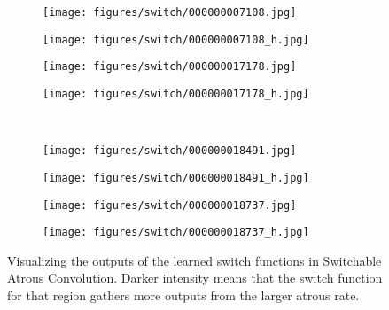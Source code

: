 \documentclass[final]{cvpr}
\begin{document}
\begin{figure*}
    \centering
    \begin{subfigure}[t]{0.24\linewidth}
        \centering
        \texttt{[image: figures/switch/000000007108.jpg]}
    \end{subfigure}
    \hfill
    \begin{subfigure}[t]{0.244\linewidth}
        \centering
        \texttt{[image: figures/switch/000000007108\_h.jpg]}
    \end{subfigure}
    \hfill
        \begin{subfigure}[t]{0.24\linewidth}
        \centering
        \texttt{[image: figures/switch/000000017178.jpg]}
    \end{subfigure}
    \hfill
    \begin{subfigure}[t]{0.244\linewidth}
        \centering
        \texttt{[image: figures/switch/000000017178\_h.jpg]}
    \end{subfigure}\\
    \begin{subfigure}[t]{0.24\linewidth}
        \centering
        \texttt{[image: figures/switch/000000018491.jpg]}
    \end{subfigure}
    \hfill
    \begin{subfigure}[t]{0.244\linewidth}
        \centering
        \texttt{[image: figures/switch/000000018491\_h.jpg]}
    \end{subfigure}
    \hfill
    \begin{subfigure}[t]{0.24\linewidth}
        \centering
        \texttt{[image: figures/switch/000000018737.jpg]}
    \end{subfigure}    
    \hfill
    \begin{subfigure}[t]{0.244\linewidth}
        \centering
        \texttt{[image: figures/switch/000000018737\_h.jpg]}
    \end{subfigure}
    \caption{Visualizing the outputs of the learned switch functions in Switchable Atrous Convolution.
    Darker intensity means that the switch function for that region gathers more outputs from the larger atrous rate.}
    \label{fig:switch}
\end{figure*}
\end{document}
